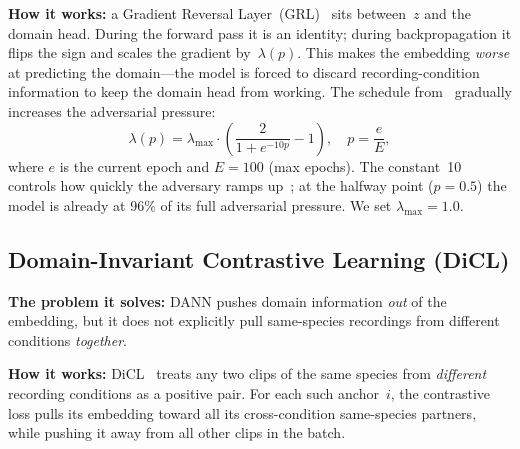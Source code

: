 \textbf{How it works:} a Gradient Reversal Layer~(GRL)~\cite{dann2016}
sits between~$z$ and the domain head.
During the forward pass it is an identity; during backpropagation it
flips the sign and scales the gradient by~$\lambda(p)$.
This makes the embedding \emph{worse} at predicting the domain---the
model is forced to discard recording-condition information to keep the
domain head from working.
The schedule from~\cite{dann2016} gradually increases the adversarial
pressure:
\begin{equation}
  \lambda(p) = \lambda_{\max}\!\cdot\!\left(\frac{2}{1+e^{-10p}}-1\right),
  \quad p = \frac{e}{E},
  \label{eq:dann_schedule}
\end{equation}
where $e$ is the current epoch and $E{=}100$ (max epochs).
The constant~10 controls how quickly the adversary ramps up~\cite{dann2016};
at the halfway point ($p{=}0.5$) the model is already at 96\% of its
full adversarial pressure.
We set $\lambda_{\max}{=}1.0$.

\subsection{Domain-Invariant Contrastive Learning (DiCL)}
\label{sec:method:dicl}

\textbf{The problem it solves:} DANN pushes domain information
\emph{out} of the embedding, but it does not explicitly pull
same-species recordings from different conditions
\emph{together}.

\textbf{How it works:} DiCL~\cite{drbiol2025} treats any two clips of
the same species from \emph{different} recording conditions as a
positive pair.
For each such anchor~$i$, the contrastive loss pulls its embedding
toward all its cross-condition same-species partners, while pushing
it away from all other clips in the batch.

